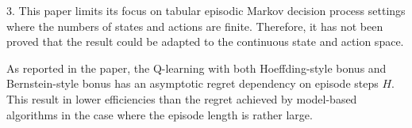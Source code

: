 \begin{Solution}
\begin{enumerate} [label=\alph*)]
        3.
        This paper limits its focus on tabular episodic Markov decision process settings where the numbers of states and actions are finite. Therefore, it has not been proved that the result could be adapted to the continuous state and action space.
        
        As reported in the paper, the Q-learning with both Hoeffding-style bonus and Bernstein-style bonus has an asymptotic regret dependency on episode steps $H$. This result in lower efficiencies than the regret achieved by model-based algorithms in the case where the episode length is rather large.
    \end{enumerate}



\end{Solution}